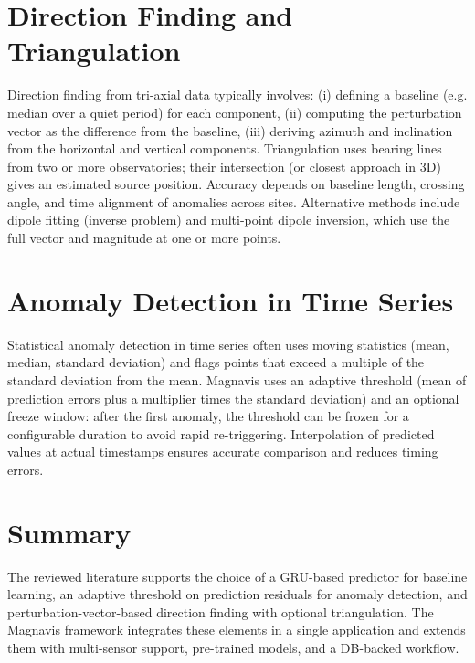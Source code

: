 \section{Direction Finding and Triangulation}
Direction finding from tri-axial data typically involves: (i) defining a baseline (e.g. median over a quiet period) for each component, (ii) computing the perturbation vector as the difference from the baseline, (iii) deriving azimuth and inclination from the horizontal and vertical components. Triangulation uses bearing lines from two or more observatories; their intersection (or closest approach in 3D) gives an estimated source position. Accuracy depends on baseline length, crossing angle, and time alignment of anomalies across sites. Alternative methods include dipole fitting (inverse problem) and multi-point dipole inversion, which use the full vector and magnitude at one or more points.

\section{Anomaly Detection in Time Series}
Statistical anomaly detection in time series often uses moving statistics (mean, median, standard deviation) and flags points that exceed a multiple of the standard deviation from the mean. Magnavis uses an adaptive threshold (mean of prediction errors plus a multiplier times the standard deviation) and an optional freeze window: after the first anomaly, the threshold can be frozen for a configurable duration to avoid rapid re-triggering. Interpolation of predicted values at actual timestamps ensures accurate comparison and reduces timing errors.

\section{Summary}
The reviewed literature supports the choice of a GRU-based predictor for baseline learning, an adaptive threshold on prediction residuals for anomaly detection, and perturbation-vector-based direction finding with optional triangulation. The Magnavis framework integrates these elements in a single application and extends them with multi-sensor support, pre-trained models, and a DB-backed workflow.
